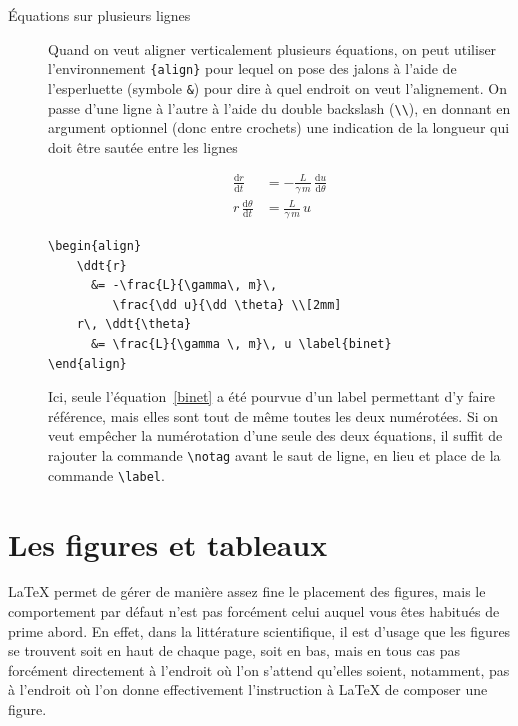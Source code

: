 \documentclass[12pt,a4paper]{article}
\newenvironment{code}{%
\begin{mdframed}[linecolor=Green,innerrightmargin=30pt,innerleftmargin=30pt,
backgroundcolor=Black!5,
skipabove=10pt,skipbelow=10pt,roundcorner=5pt,
splitbottomskip=6pt,splittopskip=12pt]
}{%
\end{mdframed}
}
\newcommand{\ofg}[1]{\og{}#1\fg{}}
\newcommand{\dd}{\text{d}}
\newcommand{\ddt}[1]{\frac{\dd #1}{\dd t}}
\newcommand{\env}[1]{\texttt{\{#1\}}}
\newcommand{\cmd}[1]{\texttt{\textbackslash#1}}
\begin{document}
\begin{description}
	\item[Équations sur plusieurs lignes] Quand on veut aligner verticalement plusieurs équations, on peut utiliser l'environnement \env{align} pour lequel on pose des \ofg{jalons} à l'aide de l'esperluette (symbole \texttt{\&}) pour dire à quel endroit on veut l'alignement. On passe d'une ligne à l'autre à l'aide du double backslash (\texttt{\textbackslash\textbackslash}), en donnant en argument optionnel (donc entre crochets) une indication de la longueur qui doit être sautée entre les lignes

\begin{align}
    \ddt{r} 		 &= -\frac{L}{\gamma\, m}\, \frac{\dd u}{\dd \theta} \\[2mm]
    r\, \ddt{\theta} &= \frac{L}{\gamma \, m}\, u \label{binet}
\end{align}

\begin{code}
\begin{verbatim}
\begin{align}
    \ddt{r}          
      &= -\frac{L}{\gamma\, m}\, 
         \frac{\dd u}{\dd \theta} \\[2mm]
    r\, \ddt{\theta} 
      &= \frac{L}{\gamma \, m}\, u \label{binet}
\end{align}
\end{verbatim}
\end{code}

Ici, seule l'équation~\ref{binet} a été pourvue d'un label permettant d'y faire référence, mais elles sont tout de même toutes les deux numérotées. Si on veut empêcher la numérotation d'une seule des deux équations, il suffit de rajouter la commande \cmd{notag} avant le saut de ligne, en lieu et place de la commande \cmd{label}.

    \end{description}

\section{Les figures et tableaux}

\LaTeX{} permet de gérer de manière assez fine le placement des figures, mais le comportement par défaut n'est pas forcément celui auquel vous êtes habitués de prime abord. En effet, dans la littérature scientifique, il est d'usage que les figures se trouvent soit en haut de chaque page, soit en bas, mais en tous cas pas forcément directement à l'endroit où l'on s'attend qu'elles soient, notamment, pas à l'endroit où l'on donne effectivement l'instruction à \LaTeX{} de composer une figure.
\end{document}

